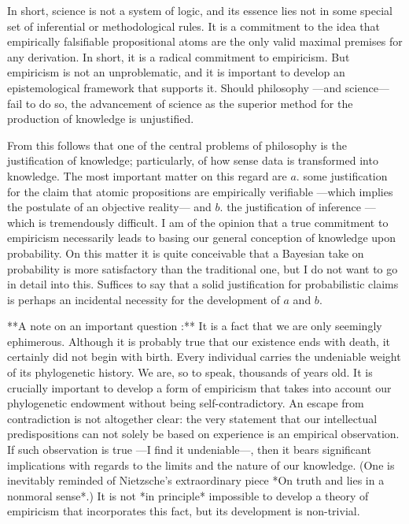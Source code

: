 \documentclass[a4paper]{article}
\begin{document}
In short, science is not a system of logic, and its essence lies not in some
special set of inferential or methodological rules. It is a commitment to the
idea that empirically falsifiable propositional atoms are the only valid maximal
premises for any derivation. In short, it is a radical commitment to empiricism.
But empiricism is not an unproblematic, and it is important to develop an
epistemological framework that supports it. Should philosophy —and science— fail
to do so, the advancement of science as the superior method for the production
of knowledge is unjustified.

From this follows that one of the central problems of philosophy is the
justification of knowledge; particularly, of how sense data is transformed into
knowledge. The most important matter on this regard are $a.$ some justification
for the claim that atomic propositions are empirically verifiable —which implies
the postulate of an objective reality— and $b.$ the justification of inference
—which is tremendously difficult. I am of the opinion that a true commitment to
empiricism necessarily leads to basing our general conception of knowledge upon
probability. On this matter it is quite conceivable that a Bayesian take on
probability is more satisfactory than the traditional one, but I do not want to
go in detail into this. Suffices to say that a solid justification for
probabilistic claims is perhaps an incidental necessity for the development of
$a$ and $b$.

**A note on an important question :** It is a fact that we are only seemingly
ephimerous. Although it is probably true that our existence ends with death, it
certainly did not begin with birth. Every individual carries the undeniable
weight of its phylogenetic history. We are, so to speak, thousands of years old.
It is crucially important to develop a form of empiricism that takes into
account our phylogenetic endowment without being self-contradictory. An escape
from contradiction is not altogether clear: the very statement that our
intellectual predispositions can not solely be based on experience is an
empirical observation. If such observation is true —I find it undeniable—, then
it bears significant implications with regards to the limits and the nature of
our knowledge. (One is inevitably reminded of Nietzsche's extraordinary piece
*On truth and lies in a nonmoral sense*.) It is not *in principle* impossible to
develop a theory of empiricism that incorporates this fact, but its 
development is non-trivial.
\end{document}
